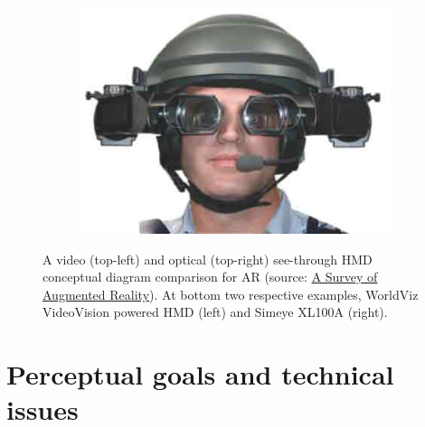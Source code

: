 \begin{figure}
\begin{subfigure}{0.49\textwidth}
\end{subfigure}
\hspace{\fill}
\begin{subfigure}{0.49\textwidth}
\includegraphics[width=\linewidth]{pictures/opticalST_example}
\end{subfigure}
\vspace*{-3mm}
\caption{A video (top-left) and optical (top-right) see-through HMD conceptual diagram comparison for AR (source: \href{http://www.cs.unc.edu/~azuma/ARpresence.pdf}{A Survey of Augmented Reality}). At bottom two respective examples, WorldViz VideoVision powered HMD (left) and Simeye XL100A (right).}
\label{fig:video_optical_seethrough_comparison}
\end{figure}

\section{Perceptual goals and technical issues}
